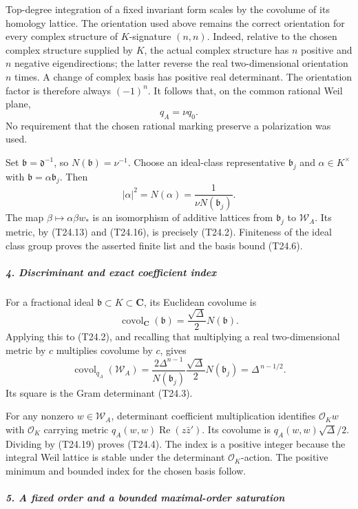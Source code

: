 \documentclass[11pt,a4paper]{article}
\theoremstyle{definition}
\begin{document}
Top-degree integration of a fixed invariant form scales by the covolume of its homology lattice. The orientation used above remains the correct orientation for every complex structure of \(K\)-signature \((n,n)\). Indeed, relative to the chosen complex structure supplied by \(K\), the actual complex structure has \(n\) positive and \(n\) negative eigendirections; the latter reverse the real two-dimensional orientation \(n\) times. A change of complex basis has positive real determinant. The orientation factor is therefore always \((-1)^n\). It follows that, on the common rational Weil plane, \[
 q_A=\nu q_0.
 \tag{T24.16}
\] No requirement that the chosen rational marking preserve a polarization was used.

Set \(\mathfrak b=\mathfrak d^{-1}\), so \(N(\mathfrak b)=\nu^{-1}\). Choose an ideal-class representative \(\mathfrak b_j\) and \(\alpha\in K^\times\) with \(\mathfrak b=\alpha\mathfrak b_j\). Then \[
 |\alpha|^2=N(\alpha)=\frac{1}{\nu N(\mathfrak b_j)}.
 \tag{T24.17}
\] The map \(\beta\mapsto\alpha\beta w_*\) is an isomorphism of additive lattices from \(\mathfrak b_j\) to \(\mathscr W_A\). Its metric, by (T24.13) and (T24.16), is precisely (T24.2). Finiteness of the ideal class group proves the asserted finite list and the basis bound (T24.6).

\subparagraph{4. Discriminant and exact coefficient index}\label{discriminant-and-exact-coefficient-index}

For a fractional ideal \(\mathfrak b\subset K\subset\mathbf C\), its Euclidean covolume is \[
 \operatorname{covol}_{\mathbf C}(\mathfrak b)
       =\frac{\sqrt\Delta}{2}N(\mathfrak b).
 \tag{T24.18}
\] Applying this to (T24.2), and recalling that multiplying a real two-dimensional metric by \(c\) multiplies covolume by \(c\), gives \[
 \operatorname{covol}_{q_A}(\mathscr W_A)
      =\frac{2\Delta^{n-1}}{N(\mathfrak b_j)}
          \frac{\sqrt\Delta}{2}N(\mathfrak b_j)
      =\Delta^{\,n-1/2}.
 \tag{T24.19}
\] Its square is the Gram determinant (T24.3).

For any nonzero \(w\in\mathscr W_A\), determinant coefficient multiplication identifies \(\mathcal O_Kw\) with \(\mathcal O_K\) carrying metric \(q_A(w,w)\operatorname{Re}(z\bar z')\). Its covolume is \(q_A(w,w)\sqrt\Delta/2\). Dividing by (T24.19) proves (T24.4). The index is a positive integer because the integral Weil lattice is stable under the determinant \(\mathcal O_K\)-action. The positive minimum and bounded index for the chosen basis follow.

\subparagraph{5. A fixed order and a bounded maximal-order saturation}\label{a-fixed-order-and-a-bounded-maximal-order-saturation}
\end{document}
